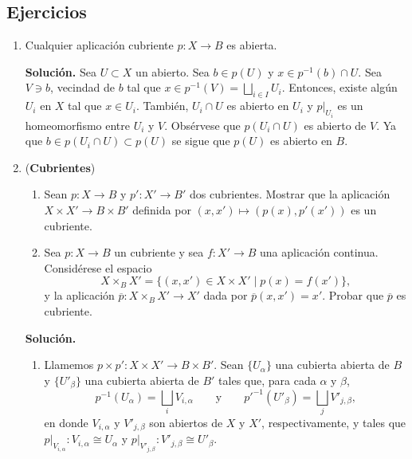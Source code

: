 \documentclass[11pt,a4paper]{article}
\theoremstyle{plain}
\theoremstyle{definition}
\theoremstyle{remark}
\begin{document}
\subsection*{Ejercicios}

\begin{enumerate}[label=\arabic*.,leftmargin=*]

\item Cualquier aplicación cubriente $p:X\to B$ es abierta.

\noindent\textbf{Solución.} Sea $U\subset X$ un abierto. Sea $b\in p(U)$ y
$x\in p^{-1}(b)\cap U$. Sea $V\ni b$, vecindad de $b$ tal que
$x\in p^{-1}(V)=\bigsqcup_{i\in I}U_i$. Entonces, existe algún $U_i$ en $X$
tal que $x\in U_i$. También, $U_i\cap U$ es abierto en $U_i$ y $p|_{U_i}$ es
un homeomorfismo entre $U_i$ y $V$. Obsérvese que $p(U_i\cap U)$ es abierto
de $V$. Ya que $b\in p(U_i\cap U)\subset p(U)$ se sigue que $p(U)$ es
abierto en $B$.

\item (\textbf{Cubrientes})
\begin{enumerate}[label=\alph*)]
\item Sean $p:X\to B$ y $p':X'\to B'$ dos cubrientes. Mostrar que la
aplicación $X\times X'\to B\times B'$ definida por
$(x,x')\mapsto(p(x),p'(x'))$ es un cubriente.
\item Sea $p:X\to B$ un cubriente y sea $f:X'\to B$ una aplicación
continua. Considérese el espacio
\[
X\times_BX'=\{(x,x')\in X\times X'\mid p(x)=f(x')\},
\]
y la aplicación $\overline p:X\times_BX'\to X'$ dada por
$\overline p(x,x')=x'$. Probar que $\overline p$ es cubriente.
\end{enumerate}

\noindent\textbf{Solución.}
\begin{enumerate}[label=\alph*)]
\item Llamemos $p\times p':X\times X'\to B\times B'$. Sean $\{U_\alpha\}$
una cubierta abierta de $B$ y $\{U'_\beta\}$ una cubierta abierta de $B'$
tales que, para cada $\alpha$ y $\beta$,
\[
p^{-1}(U_\alpha)=\bigsqcup_iV_{i,\alpha} \qquad\text{y}\qquad
p'^{-1}(U'_\beta)=\bigsqcup_jV'_{j,\beta},
\]
en donde $V_{i,\alpha}$ y $V'_{j,\beta}$ son abiertos de $X$ y $X'$,
respectivamente, y tales que $p|_{V_{i,\alpha}}:V_{i,\alpha}\cong U_\alpha$
y $p|_{V'_{j,\beta}}:V'_{j,\beta}\cong U'_\beta$.


\end{enumerate}
\end{enumerate}
\end{document}
